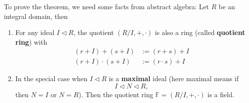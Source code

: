 \documentclass[12pt]{amsbook}
\begin{document}
To prove the theorem, we need some facts from abstract algebra: Let $R$ be an integral domain, then

\begin{enumerate}
    \item For any ideal $I \lhd R$, the quotient $(R/I, +, \cdot)$ is also a ring (called {\bf quotient ring}) with
    \begin{align*}
    (r+I) + (s+I) &:= (r+s)+I \\    
    (r+I) \cdot (s+I) &:= (r\cdot s)+I    
    \end{align*}
    \item In the special case when $I \lhd R$ is a {\bf maximal} ideal (here maximal means if 
    $$I \lhd N \lhd R,$$
    then $N = I$ or $N = R$). Then the quotient ring $\mathbb{F} = (R/I,+,\cdot)$ is a field.
\end{enumerate}
\end{document}
